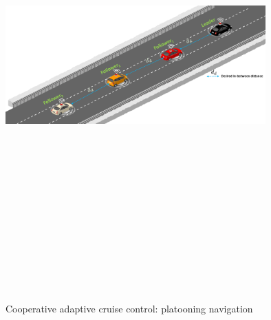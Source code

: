 






\begin{figure}[!h]
        \centering 
        \includegraphics[width=10cm,height=18cm,keepaspectratio]{chapters/Chapitre_2/Figures/CACC.PNG}
        \caption{Cooperative adaptive cruise control: platooning navigation}
        \label{fig:CACC}
        \end{figure}

